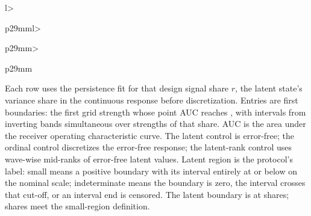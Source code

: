 \begin{table}[tp]
\begin{tabular}{l>{\raggedright\arraybackslash}p{29mm}l>{\raggedright\arraybackslash}p{29mm}>{\raggedright\arraybackslash}p{29mm}}
\botrule
\end{tabular}
\par\smallskip\parbox{\linewidth}{Each row uses the persistence fit for that design signal share $r$, the latent state's variance share in the continuous response before discretization. Entries are first boundaries: the first grid strength whose point AUC reaches , with intervals from inverting bands simultaneous over strengths of that share. AUC is the area under the receiver operating characteristic curve. The latent control is error-free; the ordinal control discretizes the error-free response; the latent-rank control uses wave-wise mid-ranks of error-free latent values. Latent region is the protocol's label: small means a positive boundary with its interval entirely at or below  on the nominal scale; indeterminate means the boundary is zero, the interval crosses that cut-off, or an interval end is censored. The latent boundary is  at  shares;  shares meet the small-region definition.}
\end{table}
